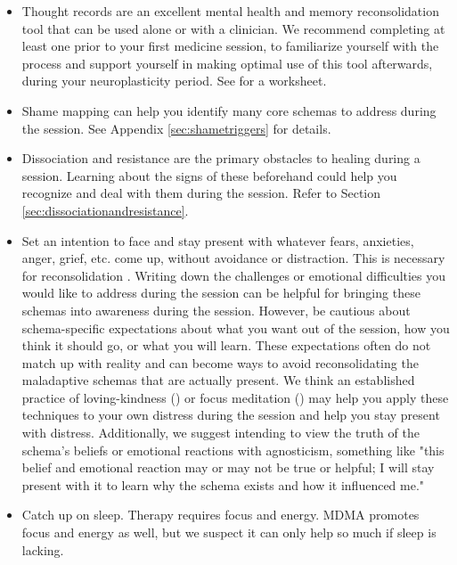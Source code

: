 \documentclass[12pt,letterpaper]{book}
\begin{document}
\begin{itemize}
    \item {} Thought records are an excellent mental health and memory reconsolidation tool that can be used alone or with a clinician. We recommend completing at least one prior to your first medicine session, to familiarize yourself with the process and support yourself in making optimal use of this tool afterwards, during your neuroplasticity period. See \textcite{harperThought} for a worksheet.
    \item Shame mapping can help you identify many core schemas to address during the session. See Appendix \ref{sec:shametriggers} for details.
    \item Dissociation and resistance are the primary obstacles to healing during a session. Learning about the signs of these beforehand could help you recognize and deal with them during the session. Refer to Section \ref{sec:dissociationandresistance}.
    \item Set an intention to face and stay present with whatever fears, anxieties, anger, grief, etc. come up, without avoidance or distraction. This is necessary for reconsolidation \cite{eckerUnlocking}. Writing down the challenges or emotional difficulties you would like to address during the session can be helpful for bringing these schemas into awareness during the session. However, be cautious about schema-specific expectations about what you want out of the session, how you think it should go, or what you will learn. These expectations often do not match up with reality and can become ways to avoid reconsolidating the maladaptive schemas that are actually present. We think an established practice of loving-kindness (\textcite{lkMeditation}) or focus meditation (\textcite{rain}) may help you apply these techniques to your own distress during the session and help you stay present with distress. Additionally, we suggest intending to view the truth of the schema's beliefs or emotional reactions with agnosticism, something like "this belief and emotional reaction may or may not be true or helpful; I will stay present with it to learn why the schema exists and how it influenced me."
    \item Catch up on sleep. Therapy requires focus and energy. MDMA promotes focus and energy as well, but we suspect it can only help so much if sleep is lacking.

\end{itemize}
\end{document}
